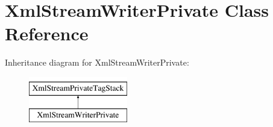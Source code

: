 \hypertarget{class_xml_stream_writer_private}{}\section{Xml\+Stream\+Writer\+Private Class Reference}
\label{class_xml_stream_writer_private}
Inheritance diagram for Xml\+Stream\+Writer\+Private\+:\begin{figure}[H]
\begin{center}
\leavevmode
\includegraphics[height=2.000000cm]{class_xml_stream_writer_private}
\end{center}
\end{figure}
